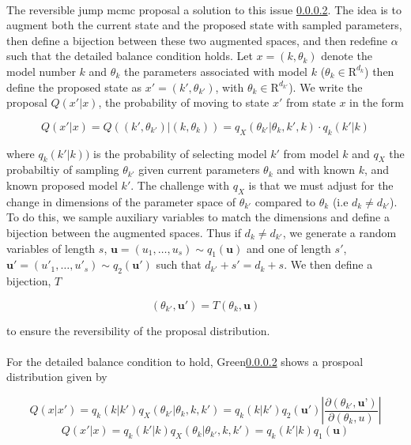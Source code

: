 \documentclass{article}
\begin{document}
\paragraph{}The reversible jump mcmc proposal a solution to this issue \ref{}. The idea is to augment both the current state and the proposed state with sampled parameters, then define a bijection between these two augmented spaces, and then redefine $\alpha$ such that the detailed balance condition holds.  Let $x = (k, \theta_k)$ denote the model number $k$ and $\theta_k$ the parameters associated with model $k$ ($\theta_k \in \mathrm{R}^{d_k}$) then define the proposed state as $x' = (k', \theta_{k'})$, with $\theta_k \in \mathrm{R}^{d_{k'}}$). We write the proposal $Q(x' | x)$, the probability of moving to state $x'$ from state $x$ in the form

\begin{equation}
 Q(x'| x) = Q\left((k', \theta_{k'}) | (k, \theta_k) \right) = q_X(  \theta_{k'} |  \theta_k, k', k) \cdot q_k(k' | k)
\end{equation}

where $q_k(k' | k))$ is  the probability of selecting model $k'$ from model $k$ and $q_X$ the probabiltiy of sampling $\theta_{k'}$ given current parameters $\theta_k$ and with known  $k$, and known proposed model $k'$. The challenge with $q_X$ is that we must adjust for the change in dimensions of the parameter space of $\theta_{k'}$ compared to $\theta_k$ (i.e $d_k \neq d_{k'}$). To do this, we sample auxiliary variables to match the dimensions and define a bijection between the augmented spaces. Thus if $d_k \neq d_{k'}$, we generate a random variables of length $s$, $\mathbf{u} = (u_1, \dots, u_s) \sim q_1(\mathbf{u})$ and one of length $s'$, $\mathbf{u'} = (u'_1, \dots, u'_s) \sim q_2(\mathbf{u}')$ such that $d_{k'} + s'= d_k + s$. We then define a bijection, $T$

\begin{equation}
\label{eq:T}
(\theta_{k'}, \mathbf{u'}) = T(\theta_k, \mathbf{u}) 
\end{equation}

to ensure the reversibility of the proposal distribution. 

\paragraph{}For the detailed balance condition to hold, Green\ref{} shows a prospoal distribution given by

$$Q(x | x') = q_k(k|k') q_X(\theta_{k'} | \theta_k, k, k') = q_k(k|k')q_2(\textbf{u}')\left|\frac{\partial(\theta_{k'}, \textbf{u'})}{\partial(\theta_k, u)} \right|$$ 
$$Q(x' | x) = q_k(k'|k) q_X(\theta_k | \theta_{k'}, k, k') = q_k(k'|k)q_1(\textbf{u})$$ 
\end{document}
